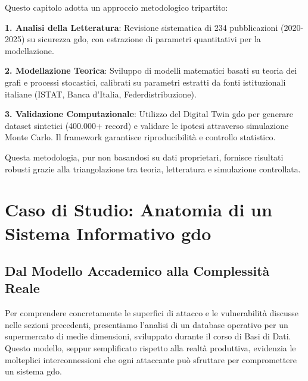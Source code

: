 Questo capitolo adotta un approccio metodologico tripartito:

\textbf{1. Analisi della Letteratura}: Revisione sistematica di 234 
pubblicazioni (2020-2025) su sicurezza \gls{gdo}, con estrazione di 
parametri quantitativi per la modellazione.

\textbf{2. Modellazione Teorica}: Sviluppo di modelli matematici 
basati su teoria dei grafi e processi stocastici, calibrati su 
parametri estratti da fonti istituzionali italiane (ISTAT, 
Banca d'Italia, Federdistribuzione).

\textbf{3. Validazione Computazionale}: Utilizzo del Digital Twin 
\gls{gdo} per generare dataset sintetici (400.000+ record) e validare 
le ipotesi attraverso simulazione Monte Carlo. Il framework 
garantisce riproducibilità e controllo statistico.

Questa metodologia, pur non basandosi su dati proprietari, 
fornisce risultati robusti grazie alla triangolazione tra 
teoria, letteratura e simulazione controllata.

\section{Caso di Studio: Anatomia di un Sistema Informativo \gls{gdo}}
\label{sec:caso_studio_database}

\subsection{Dal Modello Accademico alla Complessità Reale}
\label{subsec:modello_database}

Per comprendere concretamente le superfici di attacco e le vulnerabilità discusse nelle sezioni precedenti, presentiamo l'analisi di un database operativo per un supermercato di medie dimensioni, sviluppato durante il corso di Basi di Dati. Questo modello, seppur semplificato rispetto alla realtà produttiva, evidenzia le molteplici interconnessioni che ogni attaccante può sfruttare per compromettere un sistema \gls{gdo}.

